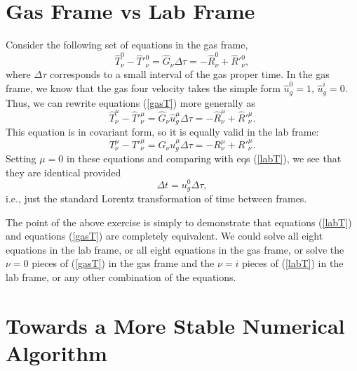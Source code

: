 \documentclass[12pt,preprint]{aastex}
\begin{document}
\section{Gas Frame vs Lab Frame}

Consider the following set of equations in the gas frame,
\begin{equation}
\widehat{T}^0_\nu-\widehat{T}'^0_\nu = \widehat{G}_\nu \Delta \tau = 
-\widehat{R}^0_\nu+\widehat{R}'^0_\nu,
\label{gasT}
\end{equation}
where $\Delta \tau$ corresponds to a small interval of the gas proper
time. In the gas frame, we know that the gas four velocity takes the
simple form $\widehat{u}^0_g=1$, $\widehat{u}^i_g=0$. Thus, we can
rewrite equations (\ref{gasT}) more generally as
\begin{equation}
\widehat{T}^\mu_\nu-\widehat{T}'^\mu_\nu = \widehat{G}_\nu
\widehat{u}^\mu_g\Delta \tau =
-\widehat{R}^\mu_\nu+\widehat{R}'^\mu_\nu.
\label{gasT2}
\end{equation}
This equation is in covariant form, so it is equally valid in the lab
frame:
\begin{equation}
T^\mu_\nu-T'^\mu_\nu = G_\nu u^\mu_g\Delta \tau =
-R^\mu_\nu+R'^\mu_\nu.
\label{labT2}
\end{equation}
Setting $\mu=0$ in these equations and comparing with eqs
(\ref{labT}), we see that they are identical provided
\begin{equation}
\Delta t = u^0_g \Delta \tau,
\label{tau}
\end{equation}
i.e., just the standard Lorentz transformation of time between frames.

The point of the above exercise is simply to demonstrate that
equations (\ref{labT}) and equations (\ref{gasT}) are completely
equivalent. We could solve all eight equations in the lab frame, or
all eight equations in the gas frame, or solve the $\nu=0$ pieces of
(\ref{gasT}) in the gas frame and the $\nu=i$ pieces of (\ref{labT})
in the lab frame, or any other combination of the equations.

\section{Towards a More Stable Numerical Algorithm}
\end{document}
